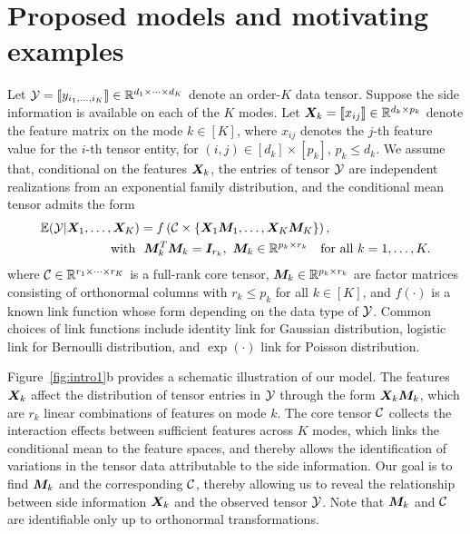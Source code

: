 \documentclass{article}
\theoremstyle{definition}
\theoremstyle{definition}
\begin{document}
\section{Proposed models and motivating examples}
Let $\mathcal{Y}=\llbracket y_{i_1,\ldots,i_K} \rrbracket\in\mathbb{R}^{d_1\times \cdots\times d_K}$ denote an order-$K$ data tensor. Suppose the side information is available on each of the $K$ modes. Let $\bm X_k=\llbracket x_{ij} \rrbracket\in\mathbb{R}^{d_k\times p_k}$ denote the feature matrix on the mode $k\in[K]$, where $x_{ij}$ denotes the $j$-th feature value for the $i$-th tensor entity, for $(i,j)\in[d_k]\times[p_k]$, $p_k\leq d_k$. We assume that, conditional on the features $\bm X_k$, the entries of tensor $\mathcal{Y}$ are independent realizations from an exponential family distribution, and the conditional mean tensor admits the form
\begin{align}\label{eq:decomp}
\mathbb{E}(\tY|\mX_1,\ldots,\mX_K) &= f\left(\tC\times\{\mX_1\mM_1, \ldots, \mX_K\mM_K\}\right),\notag\\
\text{with} \ &\ \mM_k^T\mM_k = \mI_{r_k},\ \mM_k\in\mathbb{R}^{p_k\times r_k}\quad \text{for all }k=1,\ldots,K.
\end{align}
where $\mathcal{C}\in\mathbb{R}^{r_1\times \cdots \times r_K}$ is a full-rank core tensor, $\bm M_k\in\mathbb{R}^{p_k\times r_k}$ are factor matrices consisting of orthonormal columns with $r_k\leq p_k$ for all $k\in[K]$, and $f(\cdot)$ is a known link function whose form depending on the data type of $\mathcal{Y}$. Common choices of link functions include identity link for Gaussian distribution, logistic link for Bernoulli distribution, and $\exp(\cdot)$ link for Poisson distribution. 

Figure~\ref{fig:intro1}b provides a schematic illustration of our model. The features $\bm X_k$ affect the distribution of tensor entries in $\mathcal{Y}$ through the form $\bm X_k\bm M_k$, which are $r_k$ linear combinations of features on mode $k$. The core tensor $\mathcal{C}$ collects the interaction effects between sufficient features across $K$ modes, which links the conditional mean to the feature spaces, and thereby allows the identification of variations in the tensor data attributable to the side information. Our goal is to find $\bm M_k$ and the corresponding $\mathcal{C}$, thereby allowing us to reveal the relationship between side information $\bm X_k$ and the observed tensor $\mathcal{Y}$. Note that $\bm M_k$ and $\mathcal{C}$ are identifiable only up to orthonormal transformations.  
\end{document}
